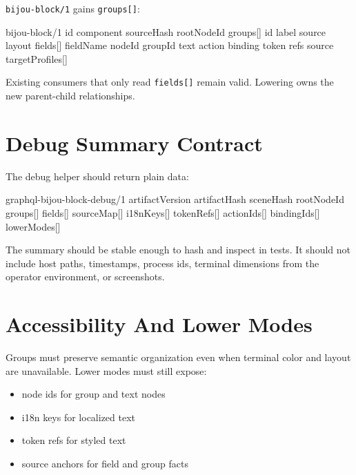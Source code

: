\texttt{b\allowbreak{}i\allowbreak{}j\allowbreak{}o\allowbreak{}u\allowbreak{}-\allowbreak{}b\allowbreak{}l\allowbreak{}o\allowbreak{}c\allowbreak{}k\allowbreak{}/\allowbreak{}1} gains \texttt{g\allowbreak{}r\allowbreak{}o\allowbreak{}u\allowbreak{}p\allowbreak{}s\allowbreak{}[\allowbreak{}]}:

\begin{CodeBlock}
bijou-block/1
  id
  component
  sourceHash
  rootNodeId
  groups[]
    id
    label
    source
    layout
  fields[]
    fieldName
    nodeId
    groupId
    text
    action
    binding
    token refs
    source
  targetProfiles[]
\end{CodeBlock}

Existing consumers that only read \texttt{f\allowbreak{}i\allowbreak{}e\allowbreak{}l\allowbreak{}d\allowbreak{}s\allowbreak{}[\allowbreak{}]} remain valid. Lowering owns the new parent-child relationships.

\section{Debug Summary Contract}\label{record-141-debug-summary-contract}

The debug helper should return plain data:

\begin{CodeBlock}
graphql-bijou-block-debug/1
  artifactVersion
  artifactHash
  sceneHash
  rootNodeId
  groups[]
  fields[]
  sourceMap[]
  i18nKeys[]
  tokenRefs[]
  actionIds[]
  bindingIds[]
  lowerModes[]
\end{CodeBlock}

The summary should be stable enough to hash and inspect in tests. It should not include host paths, timestamps, process ids, terminal dimensions from the operator environment, or screenshots.

\section{Accessibility And Lower Modes}\label{record-141-accessibility-and-lower-modes}

Groups must preserve semantic organization even when terminal color and layout are unavailable. Lower modes must still expose:

\begin{itemize}
\tightlist
\item
  node ids for group and text nodes
\item
  i18n keys for localized text
\item
  token refs for styled text
\item
  source anchors for field and group facts
\end{itemize}

